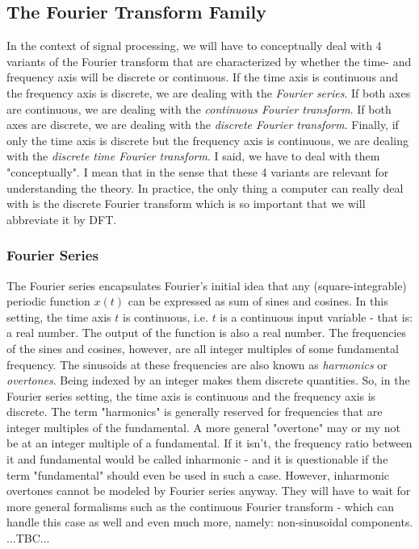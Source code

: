 \subsection{The Fourier Transform Family}
In the context of signal processing, we will have to conceptually deal with 4 variants of the Fourier transform that are characterized by whether the time- and frequency axis will be discrete or continuous. If the time axis is continuous and the frequency axis is discrete, we are dealing with the \emph{Fourier series}. If both axes are continuous, we are dealing with the \emph{continuous Fourier transform}. If both axes are discrete, we are dealing with the \emph{discrete Fourier transform}. Finally, if only the time axis is discrete but the frequency axis is continuous, we are dealing with the \emph{discrete time Fourier transform}. I said, we have to deal with them "conceptually". I mean that in the sense that these 4 variants are relevant for understanding the theory. In practice, the only thing a computer can really deal with is the discrete Fourier transform which is so important that we will abbreviate it by DFT.

\subsubsection{Fourier Series}
The Fourier series encapsulates Fourier's initial idea that any (square-integrable) periodic function $x(t)$ can be expressed as sum of sines and cosines. In this setting, the time axis $t$ is continuous, i.e. $t$ is a continuous input variable - that is: a real number. The output of the function is also a real number. The frequencies of the sines and cosines, however, are all integer multiples of some fundamental frequency. The sinusoids at these frequencies are also known as \emph{harmonics} or \emph{overtones}. Being indexed by an integer makes them discrete quantities. So, in the Fourier series setting, the time axis is continuous and the frequency axis is discrete. The term "harmonics" is generally reserved for frequencies that are integer multiples of the fundamental. A more general "overtone" may or my not be at an integer multiple of a fundamental. If it isn't, the frequency ratio between it and fundamental would be called inharmonic - and it is questionable if the term "fundamental" should even be used in such a case. However, inharmonic overtones cannot be modeled by Fourier series anyway. They will have to wait for more general formalisms such as the continuous Fourier transform - which can handle this case as well and even much more, namely: non-sinusoidal components. ...TBC...

